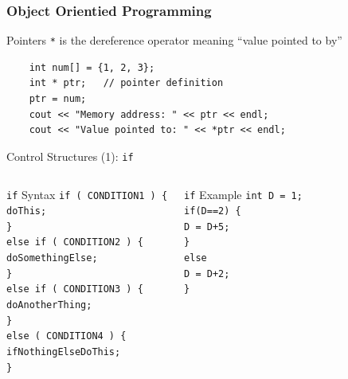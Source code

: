 \documentclass[compress]{beamer}
\newcommand{\tab}{\hspace*{1em}}
\begin{document}
\begin{frame}[fragile]
	\frametitle{Object Orientied Programming}
	\begin{exampleblock}{Pointers}
		\texttt{*} is the dereference operator meaning ``value pointed to by''
	\end{exampleblock}
	\begin{lstlisting}
	int num[] = {1, 2, 3};
	int * ptr;   // pointer definition
	ptr = num;  
	cout << "Memory address: " << ptr << endl;
	cout << "Value pointed to: " << *ptr << endl;
	\end{lstlisting}
\end{frame}
    
    \begin{frame}{Control Structures (1): \texttt{if}}
    	\begin{columns}
    		\column[t]{5cm}
    		\begin{exampleblock}{\texttt{if} Syntax}
    			\texttt{if ( CONDITION1 ) \{ \\
    				\tab doThis; \\
    				\} \\
    				else if ( CONDITION2 ) \{ \\ 
    				\tab doSomethingElse; \\
    				\} \\
    				else if ( CONDITION3 ) \{ \\
    				\tab doAnotherThing; \\
    				\} \\
    				else ( CONDITION4 ) \{ \\
    				\tab ifNothingElseDoThis; \\
    				\} \\
    			}
    		\end{exampleblock}
    		\column[t]{5cm}
    		\begin{exampleblock}{\texttt{if} Example}
    			\texttt{int D = 1; \\
    				if(D==2) \{ \\
    				\tab D = D+5;\\
    				\}\\
    				else \\
    				\tab D = D+2; \\
    				\}
    			}
    		\end{exampleblock}
    	\end{columns}
    \end{frame}
    
\end{document}
